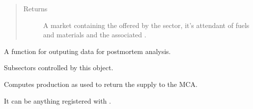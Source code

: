 \documentclass[letterpaper,10pt,english]{sphinxmanual}
\begin{document}
\begin{fulllineitems}
\begin{fulllineitems}
\begin{quote}
\begin{description}
\begin{itemize}
\end{itemize}

\item[{Returns}] \leavevmode
A market containing the  offered by the sector, it’s attendant
 of fuels and materials and the associated .

\end{description}\end{quote}

\end{fulllineitems}


\begin{fulllineitems}
\label{\detokenize{api:muse.sectors.sector.Sector.outputs}}
A function for outputing data for post\sphinxhyphen{}mortem analysis.

\end{fulllineitems}


\begin{fulllineitems}
\label{\detokenize{api:muse.sectors.sector.Sector.subsectors}}
Subsectors controlled by this object.

\end{fulllineitems}


\begin{fulllineitems}
\label{\detokenize{api:muse.sectors.sector.Sector.supply_prod}}
Computes production as used to return the supply to the MCA.

It can be anything registered with
.

\end{fulllineitems}



\end{fulllineitems}
\end{document}
